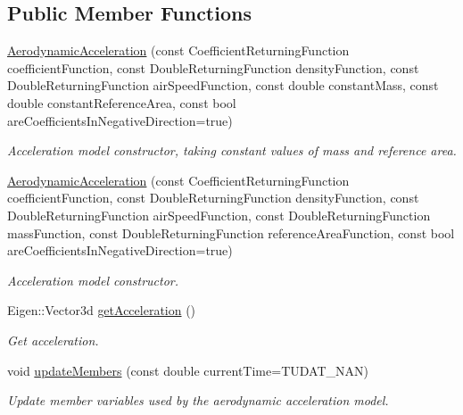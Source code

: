 \subsection*{Public Member Functions}
\begin{DoxyCompactItemize}
\item 
\hyperlink{classtudat_1_1aerodynamics_1_1AerodynamicAcceleration_a2e679984be9d798beaef6705814c8c99}{Aerodynamic\+Acceleration} (const Coefficient\+Returning\+Function coefficient\+Function, const Double\+Returning\+Function density\+Function, const Double\+Returning\+Function air\+Speed\+Function, const double constant\+Mass, const double constant\+Reference\+Area, const bool are\+Coefficients\+In\+Negative\+Direction=true)
\begin{DoxyCompactList}\small\item\em Acceleration model constructor, taking constant values of mass and reference area. \end{DoxyCompactList}\item 
\hyperlink{classtudat_1_1aerodynamics_1_1AerodynamicAcceleration_adb4d7e9bfed9d17207318080ed328332}{Aerodynamic\+Acceleration} (const Coefficient\+Returning\+Function coefficient\+Function, const Double\+Returning\+Function density\+Function, const Double\+Returning\+Function air\+Speed\+Function, const Double\+Returning\+Function mass\+Function, const Double\+Returning\+Function reference\+Area\+Function, const bool are\+Coefficients\+In\+Negative\+Direction=true)
\begin{DoxyCompactList}\small\item\em Acceleration model constructor. \end{DoxyCompactList}\item 
Eigen\+::\+Vector3d \hyperlink{classtudat_1_1aerodynamics_1_1AerodynamicAcceleration_aca8adefed3eede69b980e46d045f46eb}{get\+Acceleration} ()
\begin{DoxyCompactList}\small\item\em Get acceleration. \end{DoxyCompactList}\item 
void \hyperlink{classtudat_1_1aerodynamics_1_1AerodynamicAcceleration_a6cd45319bf7f5b7f376aa9357d1840ea}{update\+Members} (const double current\+Time=T\+U\+D\+A\+T\+\_\+\+N\+AN)
\begin{DoxyCompactList}\small\item\em Update member variables used by the aerodynamic acceleration model. \end{DoxyCompactList}\end{DoxyCompactItemize}
